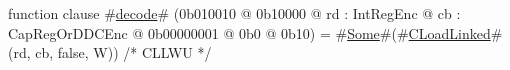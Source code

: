 function clause #\hyperref[sailMIPSzdecode]{decode}# (0b010010 @ 0b10000 @ rd : IntRegEnc @ cb : CapRegOrDDCEnc @ 0b00000001 @ 0b0 @ 0b10) = #\hyperref[sailMIPSzSome]{Some}#(#\hyperref[sailMIPSzCLoadLinked]{CLoadLinked}#(rd, cb, false, W)) /* CLLWU */
